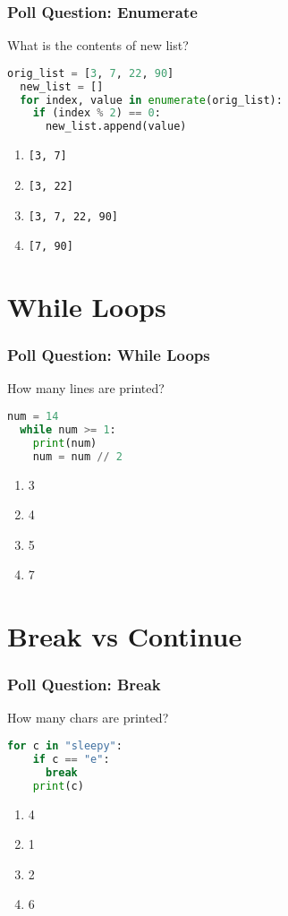 \documentclass{beamer}
\begin{document}
%
%
\begin{frame}[fragile]
  \frametitle{Poll Question: Enumerate}
  What is the contents of new list?
  \begin{lstlisting}[language=Python, autogobble]
  orig_list = [3, 7, 22, 90]
  new_list = []
  for index, value in enumerate(orig_list):
    if (index % 2) == 0:
      new_list.append(value)
  \end{lstlisting}
  \vfill
  \begin{enumerate}[A]
    \item \lstinline|[3, 7]|
    \item \lstinline|[3, 22]|
    \item \lstinline|[3, 7, 22, 90]|
    \item \lstinline|[7, 90]|
  \end{enumerate}
\end{frame}

\section{While Loops}

%
%
\begin{frame}[fragile]
  \frametitle{Poll Question: While Loops}
  How many lines are printed?
  \begin{lstlisting}[language=Python, autogobble]
  num = 14
  while num >= 1:
    print(num)
    num = num // 2
  \end{lstlisting}
  \vfill
  \begin{enumerate}[A]
    \item 3
    \item 4
    \item 5
    \item 7
  \end{enumerate}
\end{frame}

\section{Break vs Continue}
%
%
\begin{frame}[fragile]
  \frametitle{Poll Question: Break}
  How many chars are printed?
  \begin{lstlisting}[language=Python, autogobble]
  for c in "sleepy":
    if c == "e":
      break
    print(c)
  \end{lstlisting}
  \vfill
  \begin{enumerate}[A]
    \item 4
    \item 1
    \item 2
    \item 6
  \end{enumerate}
\end{frame}
\end{document}
